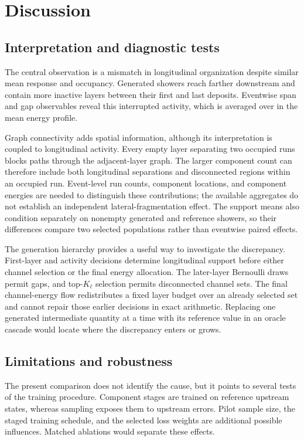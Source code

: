 \documentclass[11pt]{article}
\begin{document}
\section{Discussion}
\label{sec:discussion}

\subsection{Interpretation and diagnostic tests}

The central observation is a mismatch in longitudinal organization despite similar mean response and occupancy. Generated showers reach farther downstream and contain more inactive layers between their first and last deposits. Eventwise span and gap observables reveal this interrupted activity, which is averaged over in the mean energy profile.

Graph connectivity adds spatial information, although its interpretation is coupled to longitudinal activity. Every empty layer separating two occupied runs blocks paths through the adjacent-layer graph. The larger component count can therefore include both longitudinal separations and disconnected regions within an occupied run. Event-level run counts, component locations, and component energies are needed to distinguish these contributions; the available aggregates do not establish an independent lateral-fragmentation effect. The support means also condition separately on nonempty generated and reference showers, so their differences compare two selected populations rather than eventwise paired effects.

The generation hierarchy provides a useful way to investigate the discrepancy. First-layer and activity decisions determine longitudinal support before either channel selection or the final energy allocation. The later-layer Bernoulli draws permit gaps, and top-$K_\ell$ selection permits disconnected channel sets. The final channel-energy flow redistributes a fixed layer budget over an already selected set and cannot repair those earlier decisions in exact arithmetic. Replacing one generated intermediate quantity at a time with its reference value in an oracle cascade would locate where the discrepancy enters or grows.

\subsection{Limitations and robustness}

The present comparison does not identify the cause, but it points to several tests of the training procedure. Component stages are trained on reference upstream states, whereas sampling exposes them to upstream errors. Pilot sample size, the staged training schedule, and the selected loss weights are additional possible influences. Matched ablations would separate these effects.
\end{document}
